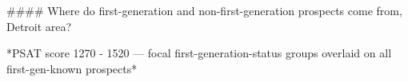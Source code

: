 #### Where do first-generation and non-first-generation prospects come from, Detroit area?

*PSAT score 1270 - 1520 — focal first-generation-status groups overlaid on all first-gen-known prospects*
